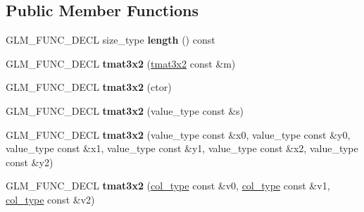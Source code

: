 \subsection*{\-Public \-Member \-Functions}
\begin{DoxyCompactItemize}
\item 
\hypertarget{structglm_1_1detail_1_1tmat3x2_ab5a97f22b487f224bba77f51318950c6}{\-G\-L\-M\-\_\-\-F\-U\-N\-C\-\_\-\-D\-E\-C\-L size\-\_\-type {\bfseries length} () const }\label{structglm_1_1detail_1_1tmat3x2_ab5a97f22b487f224bba77f51318950c6}

\item 
\hypertarget{structglm_1_1detail_1_1tmat3x2_aa5dbea756ecc0eeec0f8216ca548ad7f}{\-G\-L\-M\-\_\-\-F\-U\-N\-C\-\_\-\-D\-E\-C\-L {\bfseries tmat3x2} (\hyperlink{structglm_1_1detail_1_1tmat3x2}{tmat3x2} const \&m)}\label{structglm_1_1detail_1_1tmat3x2_aa5dbea756ecc0eeec0f8216ca548ad7f}

\item 
\hypertarget{structglm_1_1detail_1_1tmat3x2_a3d8f3014b4018f5f37c971851c5e7b16}{\-G\-L\-M\-\_\-\-F\-U\-N\-C\-\_\-\-D\-E\-C\-L {\bfseries tmat3x2} (ctor)}\label{structglm_1_1detail_1_1tmat3x2_a3d8f3014b4018f5f37c971851c5e7b16}

\item 
\hypertarget{structglm_1_1detail_1_1tmat3x2_ab49e902c0a394041a6d4c8f6b7b0a2c3}{\-G\-L\-M\-\_\-\-F\-U\-N\-C\-\_\-\-D\-E\-C\-L {\bfseries tmat3x2} (value\-\_\-type const \&s)}\label{structglm_1_1detail_1_1tmat3x2_ab49e902c0a394041a6d4c8f6b7b0a2c3}

\item 
\hypertarget{structglm_1_1detail_1_1tmat3x2_a28f71340efef5de0d7aac9da94ca4d40}{\-G\-L\-M\-\_\-\-F\-U\-N\-C\-\_\-\-D\-E\-C\-L {\bfseries tmat3x2} (value\-\_\-type const \&x0, value\-\_\-type const \&y0, value\-\_\-type const \&x1, value\-\_\-type const \&y1, value\-\_\-type const \&x2, value\-\_\-type const \&y2)}\label{structglm_1_1detail_1_1tmat3x2_a28f71340efef5de0d7aac9da94ca4d40}

\item 
\hypertarget{structglm_1_1detail_1_1tmat3x2_ab360bb1d2217122998f0c3bfc936c538}{\-G\-L\-M\-\_\-\-F\-U\-N\-C\-\_\-\-D\-E\-C\-L {\bfseries tmat3x2} (\hyperlink{structglm_1_1detail_1_1tvec2}{col\-\_\-type} const \&v0, \hyperlink{structglm_1_1detail_1_1tvec2}{col\-\_\-type} const \&v1, \hyperlink{structglm_1_1detail_1_1tvec2}{col\-\_\-type} const \&v2)}\label{structglm_1_1detail_1_1tmat3x2_ab360bb1d2217122998f0c3bfc936c538}


\end{DoxyCompactItemize}
